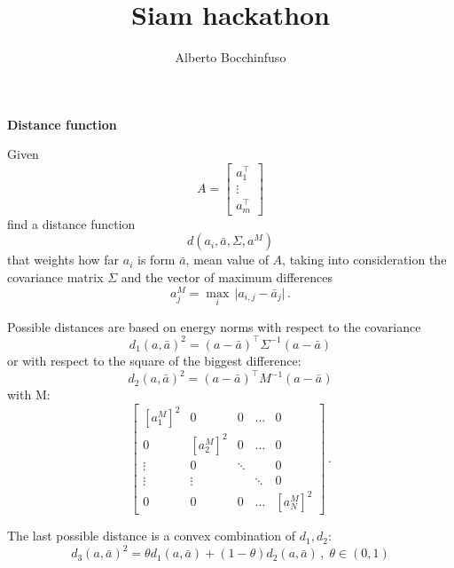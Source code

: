 \documentclass{article}
\author{Alberto Bocchinfuso}
\title{Siam hackathon}
\begin{document}
	\maketitle

\bigskip
{\Large {\bf Distance function}}
\bigskip

Given
\begin{equation}
	A = \begin{bmatrix}
		a_1^\top \\
		\vdots \\
		a_m^\top
	\end{bmatrix}
\end{equation}
find a distance function
\begin{equation}
	d(a_i, \bar{a}, \Sigma, a^{M})
\end{equation}
that weights how far $a_i$ is form $\bar{a}$, mean value of $A$, taking into consideration the covariance matrix $\Sigma$ and the vector of maximum differences
\begin{equation}
	a^{M}_j = \max_{i} \, \vert a_{i,j} - \bar{a}_j \vert \, .
\end{equation}

Possible distances are based on energy norms with respect to the covariance
\begin{equation}
	d_1(a, \bar{a})^2 = (a - \bar{a})^\top \Sigma^{-1} (a - \bar{a})
\end{equation}
or with respect to the square of the biggest difference:
\begin{equation}
	d_2(a, \bar{a})^2 = (a - \bar{a})^\top M^{-1} (a - \bar{a})
\end{equation}
with M:
\begin{equation}
\begin{bmatrix}
	\left[ a_1^M \right]^2	&0	&0	&\dots 	&0 \\
	0	&\left[ a_2^M \right]^2	&0	&\dots	&0 \\
	\vdots	&0	&\ddots	&	&0 \\
	\vdots	&\vdots	&	&\ddots	&0 \\
	0	&0	&0	&\dots	&\left[ a_N^M \right]^2
\end{bmatrix} \, .
\end{equation}

The last possible distance is a convex combination of $d_1, d_2$:
\begin{equation}
	d_3(a, \bar{a})^2 = \theta d_1(a, \bar{a}) + (1 - \theta) d_2(a, \bar{a}) \, , \; \theta \in (0, 1)
\end{equation}
\end{document}
